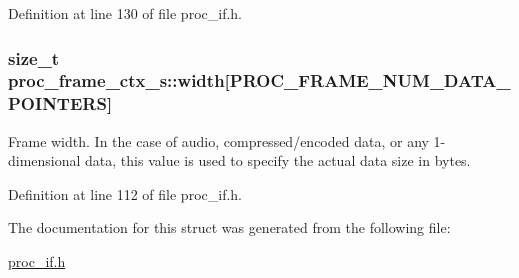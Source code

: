 Definition at line 130 of file proc\+\_\+if.\+h.

\subsubsection[{\texorpdfstring{width}{width}}]{\setlength{\rightskip}{0pt plus 5cm}size\+\_\+t proc\+\_\+frame\+\_\+ctx\+\_\+s\+::width\mbox{[}P\+R\+O\+C\+\_\+\+F\+R\+A\+M\+E\+\_\+\+N\+U\+M\+\_\+\+D\+A\+T\+A\+\_\+\+P\+O\+I\+N\+T\+E\+RS\mbox{]}}\hypertarget{structproc__frame__ctx__s_ae6221b8581a9b08b7fceaa08050dbeb5}{}\label{structproc__frame__ctx__s_ae6221b8581a9b08b7fceaa08050dbeb5}
Frame width. In the case of audio, compressed/encoded data, or any 1-\/dimensional data, this value is used to specify the actual data size in bytes. 

Definition at line 112 of file proc\+\_\+if.\+h.



The documentation for this struct was generated from the following file\+:\begin{DoxyCompactItemize}
\item 
\hyperlink{proc__if_8h}{proc\+\_\+if.\+h}\end{DoxyCompactItemize}
